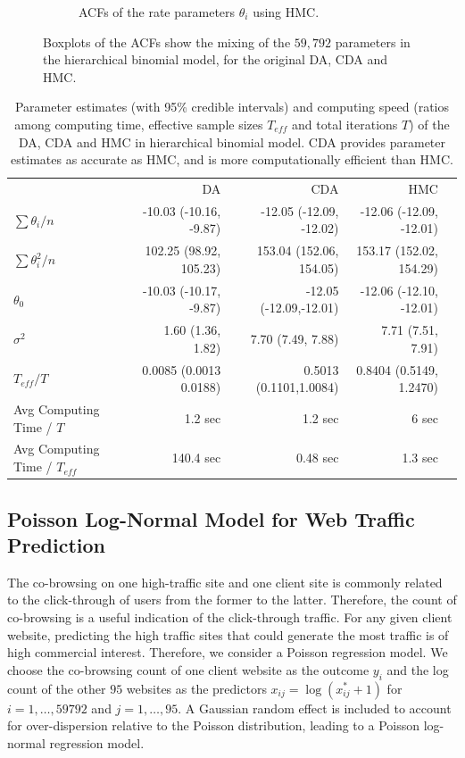 \documentclass[12pt]{article}
\begin{document}
\begin{figure}[H]
\begin{subfigure}[b]{0.32\textwidth}
 \caption{ACFs of the rate parameters $\theta_i$ using HMC.}
 \end{subfigure} 
 \caption{Boxplots of the ACFs show the mixing of the $59,792$ parameters in the hierarchical binomial model, for the original DA\citep{polson2013bayesian}, CDA and HMC.}
 \label{data_binomial}
 \end{figure}
 
 
 
\begin{table}[H]
\small
\centering
\begin{tabular}{|l |r |r| r| r |} 
 \hline
                          & DA & CDA & HMC\\
 [0.5ex]

 $ \sum \theta_i/n$      & -10.03 (-10.16, -9.87)& -12.05 (-12.09, -12.02) &  -12.06 (-12.09, -12.01)\\
 $ \sum \theta_i^2/n$      & 102.25 (98.92, 105.23)& 153.04 (152.06, 154.05) &  153.17 (152.02, 154.29)\\
$\theta_0$          & -10.03 (-10.17, -9.87)& -12.05 (-12.09,-12.01) &  -12.06 (-12.10, -12.01)\\
$\sigma^2$         & 1.60 (1.36, 1.82)&   7.70 (7.49, 7.88)  & 7.71 (7.51, 7.91)\\
$T_{eff} / T$ & 0.0085 (0.0013 0.0188) & 0.5013 (0.1101,1.0084) & 0.8404 (0.5149, 1.2470)\\
Avg Computing Time /  $T$  & 1.2 sec       & 1.2 sec        & 6 sec\\
Avg Computing Time /  $T_{eff}$  & 140.4 sec       & 0.48 sec        & 1.3 sec\\
 \hline
\end{tabular}
\caption{Parameter estimates (with 95\% credible intervals) and computing speed (ratios among computing time, effective sample sizes $T_{eff}$ and total iterations $T$) of the DA, CDA and HMC in hierarchical binomial model. CDA provides parameter estimates as accurate as HMC, and is more computationally efficient than HMC.}
\label{tab:binomial}
\end{table}


\subsection{Poisson Log-Normal Model for Web Traffic Prediction}

The co-browsing on one high-traffic site and one client site is commonly related to the click-through of users from the former to the latter. Therefore, the count of co-browsing is a useful indication of the click-through traffic. For any given client website, predicting the high traffic sites that could generate the most traffic is of high commercial interest. Therefore, we consider a Poisson regression model. We choose the co-browsing count of one client website as the outcome $y_i$ and the log count of the other $95$ websites as the predictors $x_{ij}=\log (x^*_{ij}+1)$ for $i=1,\ldots ,59792$ and $j=1,\ldots ,95$.  A Gaussian random effect is included to account for over-dispersion relative to the Poisson distribution, leading to a Poisson log-normal regression model. 
\end{document}
